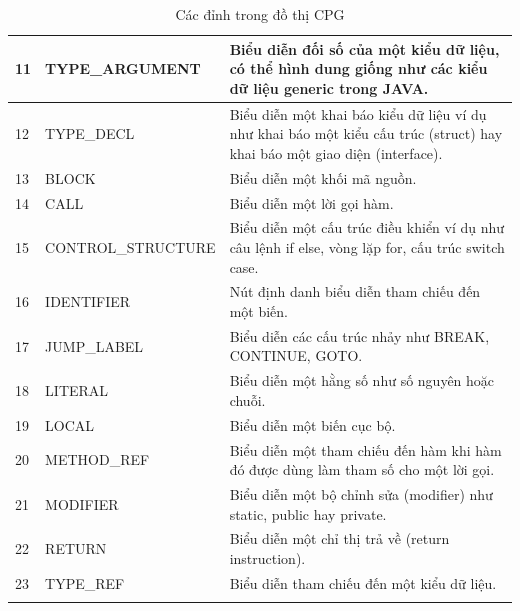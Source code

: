 \begin{longtable}{| p{} | p{} | p{} |}
11  & TYPE\_ARGUMENT     & Biểu diễn đối số của một kiểu dữ liệu, có thể hình dung giống như các kiểu dữ liệu generic trong JAVA.                                                          \\ \hline
12  & TYPE\_DECL         & Biểu diễn một khai báo kiểu dữ liệu ví dụ như khai báo một kiểu cấu trúc (struct) hay khai báo một giao diện (interface).                                       \\ \hline
13  & BLOCK             & Biểu diễn một khối mã nguồn.                                                                                                                                    \\ \hline
14  & CALL              & Biểu diễn một lời gọi hàm.                                                                                                                                      \\ \hline
15  & CONTROL\_STRUCTURE & Biểu diễn một cấu trúc điều khiển ví dụ như câu lệnh if else, vòng lặp for, cấu trúc switch case.                                                               \\ \hline
16  & IDENTIFIER        & Nút định danh biểu diễn tham chiếu đến một biến.                                                                                                                \\ \hline
17  & JUMP\_LABEL        & Biểu diễn các cấu trúc nhảy như BREAK, CONTINUE, GOTO.                                                                                                          \\ \hline
18  & LITERAL           & Biểu diễn một hằng số như số nguyên hoặc chuỗi.                                                                                                                 \\ \hline
19  & LOCAL             & Biểu diễn một biến cục bộ.                                                                                                                                      \\ \hline
20  & METHOD\_REF        & Biểu diễn một tham chiếu đến hàm khi hàm đó được dùng làm tham số cho một lời gọi.                                                                              \\ \hline
21  & MODIFIER          & Biểu diễn một bộ chỉnh sửa (modifier) như static, public hay private.                                                                                           \\ \hline
22  & RETURN            & Biểu diễn một chỉ thị trả về (return instruction).                                                                                                              \\ \hline
23  & TYPE\_REF          & Biểu diễn tham chiếu đến một kiểu dữ liệu.                                                                                                                      \\ \hline
\caption{Các đỉnh trong đồ thị CPG}
\label{table:c3_nodecpgjoern}
\end{longtable}
\medskip

